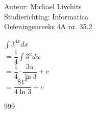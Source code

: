 \documentclass[a4paper]{article}
\begin{document}
  
\noindent \large Auteur: Michael Livchits \\
\noindent \large Studierichting:  Informatica\\
\noindent \large Oefeningenreeks 4A nr. 35.2\\

\medskip

\normalsize

$ \displaystyle\int 3^{4x}dx$\\

$ = \dfrac{1}{4}\displaystyle\int 3^udu$\\

$ = \dfrac{1}{4} \cdot \dfrac{3u}{\ln 3}+c$\\

$ = \dfrac{81^x}{4\ln 3} + c $\

\begin{thebibliography}{999}
\end{thebibliography}
\end{document}
